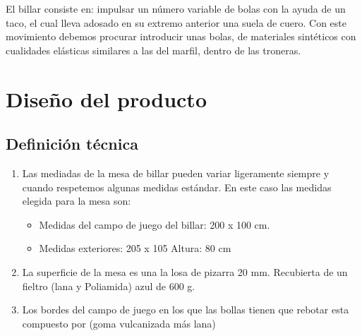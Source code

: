El billar consiste en: impulsar un número variable de bolas con la ayuda de un taco, el cual lleva adosado en su extremo anterior una suela de cuero.
Con este movimiento debemos procurar introducir unas bolas, de materiales sintéticos con cualidades elásticas similares a las del marfil, dentro de las troneras.
   
\section {Diseño del producto}

	\subsection {Definición técnica}
			\begin{enumerate}
			\item Las mediadas de la mesa de billar pueden variar ligeramente siempre y cuando respetemos algunas medidas estándar. En este caso las medidas elegida para la mesa son:
				\begin{itemize}      
				\item Medidas del campo de juego del billar: 200 x 100 cm.

				\item Medidas exteriores: 205 x 105 Altura: 80 cm
				\end{itemize}
				
			\item La superficie de la mesa es una la losa de pizarra 20 mm. Recubierta de un fieltro (lana y Poliamida) azul de 600 g.

			\item Los bordes del campo de juego en los que las bollas tienen que rebotar esta compuesto por (goma vulcanizada más lana)
			\end{enumerate}


